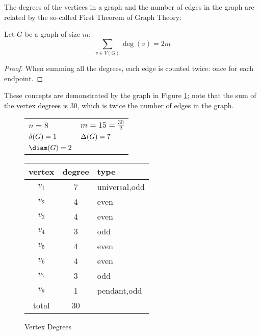 The degrees of the vertices in a graph and the number of edges in the graph are related by the so-called First
Theorem of Graph Theory:

\begin{theorem}
  Let \(G\) be a graph of size \(m\):
  \[\sum_{v\in V(G)}\deg(v)=2m\]
\end{theorem}

\begin{proof}
  When summing all the degrees, each edge is counted twice: once for each endpoint.
\end{proof}

These concepts are demonstrated by the graph in Figure \ref{fig:degree}; note that the sum of the vertex degrees is
30, which is twice the number of edges in the graph.

\begin{figure}[h]
  \label{fig:degree}
  \begin{minipage}[t]{3in}
    \begin{center}
      \vspace{0pt}

      \bigskip

      \begin{tabular}{ll}
        \(n=8\) & \(m=15=\frac{30}{2}\) \\
        \(\delta(G)=1\) & \(\Delta(G)=7\) \\
        \(\diam(G)=2\)
      \end{tabular}
    \end{center}
  \end{minipage}
  \begin{minipage}[t]{3in}
    \vspace{0pt}
    \begin{tabular}{c|c|l}
      vertex & degree & type \\
      \hline
      \(v_1\) & 7 & universal,odd \\
      \(v_2\) & 4 & even \\
      \(v_3\) & 4 & even \\
      \(v_4\) & 3 & odd \\
      \(v_5\) & 4 & even \\
      \(v_6\) & 4 & even \\
      \(v_7\) & 3 & odd \\
      \(v_8\) & 1 & pendant,odd \\
      \hline
      total & 30 &
    \end{tabular}
  \end{minipage}
  \caption{Vertex Degrees}
\end{figure}

